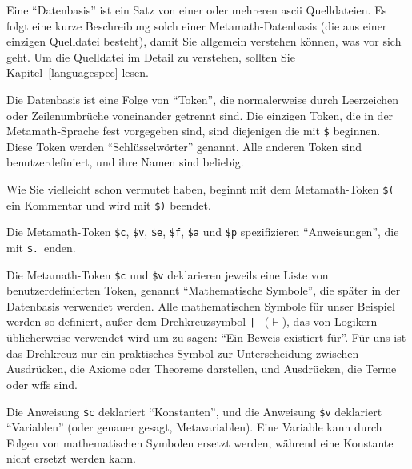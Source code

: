 Eine "`Datenbasis"' ist ein Satz von einer oder mehreren {\sc ascii} Quelldateien.  Es folgt eine kurze Beschreibung solch einer Metamath-Datenbasis (die aus einer einzigen Quelldatei besteht), damit Sie allgemein verstehen können, was vor sich geht.  Um die Quelldatei im Detail zu verstehen, sollten Sie Kapitel~\ref{languagespec} lesen.

Die Datenbasis ist eine Folge von "`Token"', die normalerweise durch Leerzeichen oder Zeilenumbrüche voneinander getrennt sind.  Die einzigen Token, die in der Metamath-Sprache fest vorgegeben sind, sind diejenigen die mit \texttt{\$} beginnen.  Diese Token werden "`Schlüsselwörter"' genannt.  Alle anderen Token sind benutzerdefiniert, und ihre Namen sind beliebig.

Wie Sie vielleicht schon vermutet haben, beginnt mit dem Metamath-Token \texttt{\$(} ein Kommentar und wird mit \texttt{\$)} beendet.

Die Metamath-Token \texttt{\$c},
\texttt{\$v},
\texttt{\$e},
\texttt{\$f},
\texttt{\$a} und
\texttt{\$p} spezifizieren "`Anweisungen"', die
mit \texttt{\$.}\, enden.

Die Metamath-Token \texttt{\$c} und \texttt{\$v} deklarieren jeweils eine Liste von benutzerdefinierten Token, genannt "`Mathematische Symbole"', die später in der Datenbasis verwendet werden.  Alle mathematischen Symbole für unser Beispiel werden so definiert, außer dem Drehkreuzsymbol \texttt{|-} ($\vdash$), das von Logikern üblicherweise verwendet wird um zu sagen: "`Ein Beweis existiert für"'.  Für uns ist das Drehkreuz nur ein praktisches Symbol zur Unterscheidung zwischen Ausdrücken, die Axiome oder Theoreme darstellen, und Ausdrücken, die Terme oder wffs sind.

Die Anweisung \texttt{\$c} deklariert "`Konstanten"', und die Anweisung \texttt{\$v} deklariert "`Variablen"' (oder genauer gesagt, Metavariablen).
Eine Variable kann durch Folgen von mathematischen Symbolen ersetzt werden, während eine Konstante nicht ersetzt werden kann.

